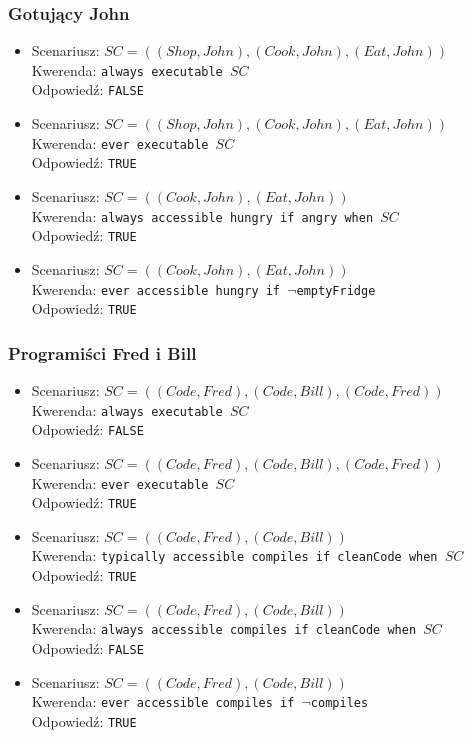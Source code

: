 \documentclass{article}
\begin{document}
\subsubsection{Gotujący John}
\begin{itemize}
\item
Scenariusz: $SC=((Shop,John),(Cook,John),(Eat,John))$\\
Kwerenda: {\large\texttt{always executable $SC$}}\\
Odpowiedź: \texttt{FALSE}
\item
Scenariusz: $SC=((Shop,John),(Cook,John),(Eat,John))$\\
Kwerenda: {\large\texttt{ever executable $SC$}}\\
Odpowiedź: \texttt{TRUE}

\item
Scenariusz: $SC=((Cook,John),(Eat,John))$\\
Kwerenda: {\large\texttt{always accessible hungry if angry when $SC$}}\\
Odpowiedź: \texttt{TRUE}

\item
Scenariusz: $SC=((Cook,John),(Eat,John))$\\
Kwerenda: {\large\texttt{ever accessible hungry if $\neg$emptyFridge}}\\
Odpowiedź: \texttt{TRUE}

\end{itemize}


\subsubsection{Programiści Fred i Bill}
\begin{itemize}
\item
Scenariusz: $SC=((Code,Fred),(Code,Bill),(Code,Fred))$\\
Kwerenda: {\large\texttt{always executable $SC$}}\\
Odpowiedź: \texttt{FALSE}
\item
Scenariusz: $SC=((Code,Fred),(Code,Bill),(Code,Fred))$\\
Kwerenda: {\large\texttt{ever executable $SC$}}\\
Odpowiedź: \texttt{TRUE}
\item
Scenariusz: $SC=((Code,Fred),(Code,Bill))$\\
Kwerenda: {\large\texttt{typically accessible compiles if cleanCode when $SC$}}\\
Odpowiedź: \texttt{TRUE}
\item
Scenariusz: $SC=((Code,Fred),(Code,Bill))$\\
Kwerenda: {\large\texttt{always accessible compiles if cleanCode when $SC$}}\\
Odpowiedź: \texttt{FALSE}
\item
Scenariusz: $SC=((Code,Fred),(Code,Bill))$\\
Kwerenda: {\large\texttt{ever accessible compiles if $\neg$compiles}}\\
Odpowiedź: \texttt{TRUE}
\end{itemize}
\end{document}
